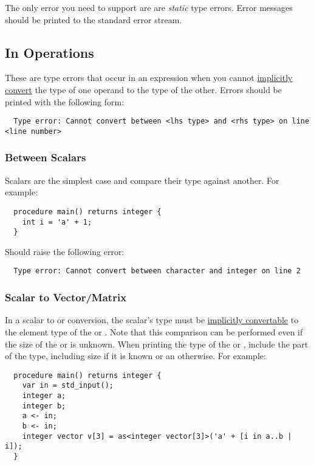 \documentclass[../gazprea.tex]{subfiles}
\begin{document}
The only error you need to support are are \textit{static} type errors. Error messages should be
printed to the standard error stream.


\subsection{In Operations}
\label{ssec:error_ops}
These are type errors that occur in an expression when you cannot
\hyperref[sec:typePromotion]{implicitly convert} the type of one operand to the type of the other.
Errors should be printed with the following form:
\begin{lstlisting}
  Type error: Cannot convert between <lhs type> and <rhs type> on line <line number>
\end{lstlisting}

\subsubsection{Between Scalars}
\label{sssec:error_ops_stos}
Scalars are the simplest case and compare their type against another. For example:
\begin{lstlisting}
  procedure main() returns integer {
    int i = 'a' + 1;
  }
\end{lstlisting}

Should raise the following error:
\begin{lstlisting}
  Type error: Cannot convert between character and integer on line 2
\end{lstlisting}

\subsubsection{Scalar to Vector/Matrix}
\label{sssec:error_ops_stovm}
\label{sssec:error_ops_stov}
\label{sssec:error_ops_stom}
In a scalar to  or  conversion, the scalar's type must be
\hyperref[typePromotion]{implicitly convertable} to the element type of the  or
. Note that this comparison can be performed even if the size of the  or
 is unknown. When printing the type of the  or , include the
 part of the type, including size if it is known or an \code{*} otherwise. For example:
\begin{lstlisting}
  procedure main() returns integer {
    var in = std_input();
    integer a;
    integer b;
    a <- in;
    b <- in;
    integer vector v[3] = as<integer vector[3]>('a' + [i in a..b | i]);
  }
\end{lstlisting}
\end{document}
